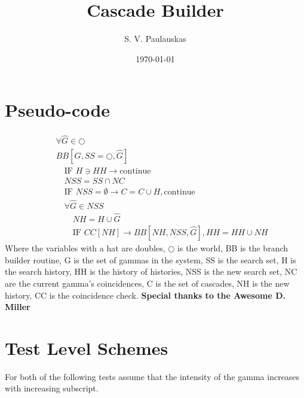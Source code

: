 \documentclass[12pt]{article}
\title{Cascade Builder}
\author{S. V. Paulauskas}
\date{\today}
\begin{document}
\maketitle
\section{Pseudo-code}
\begin{eqnarray} 
  &&\forall \hat{G} \in \bigcirc \\
  &&BB[G, SS=\bigcirc,\hat{G}]\\
  &&\quad \text{IF } H \ni HH \rightarrow \mathrm{continue} \\
  &&\quad NSS = SS \cap NC \\
  &&\quad \text{IF } NSS = \emptyset \rightarrow C=C \cup H, \mathrm{continue} \\  
  &&\quad \forall \hat{G} \in NSS \\
  &&\quad \quad NH = H \cup \hat{G} \\
  &&\quad \quad \text{IF } CC[NH] \rightarrow BB[NH, NSS, \hat{G}], HH = HH \cup NH
\end{eqnarray}
Where the variables with a hat are doubles, $\bigcirc$ is the world, BB is the 
branch builder routine, G is the set of gammas in the system, SS is the search 
set, H is the search history, HH is the history of histories, NSS is the new 
search set, NC are the current gamma's coincidences, C is the set of cascades, 
NH is the new history, CC is the coincidence check.
\textbf{Special thanks to the Awesome D. Miller}
\section{Test Level Schemes}
For both of the following tests assume that the intensity of the gamma 
increases with increasing subscript. 
\end{document}
